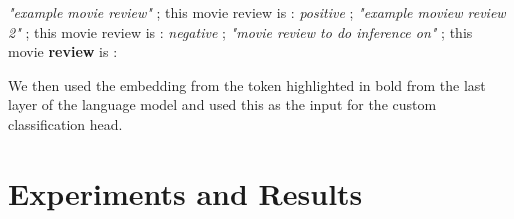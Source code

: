 \documentclass[10pt,twocolumn,letterpaper]{article}
\begin{document}
\textit{"example movie review"} ; this movie review is : \textit{positive} ; \textit{"example moview review 2"} ; this movie review is : \textit{negative} ; \textit{"movie review to do inference on"} ; this movie \textbf{review} is :

We then used the embedding from the token highlighted in bold from the last layer of the language model and used this as the input for the custom classification head.


\section{Experiments and Results}








\end{document}
